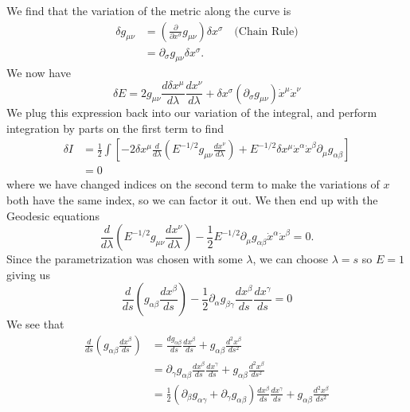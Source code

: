 We find that the variation of the metric along the curve is
\begin{subequations}
\begin{align}
\delta g_{\mu\nu} &= \left(\frac{\partial}{\partial
  x^{\sigma}}g_{\mu\nu}\right)\delta x^{\sigma}\quad\text{(Chain Rule)}\\
&= \partial_{\sigma}g_{\mu\nu}\delta x^{\sigma}.
\end{align}
\end{subequations}
We now have
\begin{equation}
\delta E = 2g_{\mu\nu}\frac{d\delta x^{\mu}}{d\lambda}\frac{dx^{\nu}}{d\lambda}
+\delta x^{\sigma}(\partial_{\sigma}g_{\mu\nu})\dot{x}^{\mu}\dot{x}^{\nu}
\end{equation}
We plug this expression back into our variation of the integral,
and perform integration by parts on the first term to find
\begin{subequations}
\begin{align}
\delta I &= \frac{1}{2}\int\left[-2\delta
  x^{\mu}\frac{d}{d\lambda}\left(E^{-1/2}g_{\mu\nu}\frac{dx^{\nu}}{d\lambda}\right)+E^{-1/2}\delta
  x^{\mu}\dot{x}^{\alpha}\dot{x}^{\beta}\partial_{\mu}g_{\alpha\beta}\right]\\
&= 0
\end{align}
\end{subequations}
where we have changed indices on the second term to make the
variations of $x$ both have the same index, so we can factor it
out. We then end up with the Geodesic equations
\begin{equation}
\frac{d}{d\lambda}\left(E^{-1/2}g_{\mu\nu}\frac{dx^{\nu}}{d\lambda}\right)
-
\frac{1}{2}E^{-1/2}\partial_{\mu}g_{\alpha\beta}\dot{x}^{\alpha}\dot{x}^{\beta}
= 0.
\end{equation}
Since the parametrization was chosen with some $\lambda$, we can
choose $\lambda=s$ so $E=1$ giving us
\begin{equation}
\boxed{
  \frac{d}{ds}\left(g_{\alpha\beta}\frac{dx^{\beta}}{ds}\right) -
  \frac{1}{2}\partial_{\alpha}g_{\beta\gamma}\frac{dx^{\beta}}{ds}\frac{dx^{\gamma}}{ds}=0}
\end{equation}
We see that
\begin{subequations}
\begin{align}
\frac{d}{ds}\left(g_{\alpha\beta}\frac{dx^{\beta}}{ds}\right) &=
\frac{dg_{\alpha\beta}}{ds}\frac{dx^{\beta}}{ds}+g_{\alpha\beta}\frac{d^{2}x^{\beta}}{ds^2}\\
&= \partial_{\gamma}g_{\alpha\beta}\frac{dx^{\beta}}{ds}\frac{dx^{\gamma}}{ds}+g_{\alpha\beta}\frac{d^{2}x^{\beta}}{ds^{2}}\\
&= \frac{1}{2}\left(\partial_{\beta}g_{\alpha\gamma}+\partial_{\gamma}g_{\alpha\beta}\right)\frac{dx^{\beta}}{ds}\frac{dx^{\gamma}}{ds}+g_{\alpha\beta}\frac{d^{2}x^{\beta}}{ds^{2}}
\end{align}
\end{subequations}
